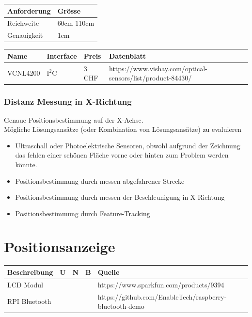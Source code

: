 \documentclass[a4paper]{report}
\begin{document}
\vspace{1em}
\noindent
\begin{tabular}{|p{}|p{}|}
  \hline
  \textbf{Anforderung} & \textbf{Grösse} \\
  \hline
  Reichweite & 60cm-110cm \\
  \hline
  Genauigkeit & 1cm \\
  \hline
\end{tabular}

\vspace{1em}
\noindent
\begin{tabular}{|p{}|p{}|p{}|p{}|}
  \hline
  \textbf{Name} & \textbf{Interface} & \textbf{Preis} & \textbf{Datenblatt} \\
  \hline
  VCNL4200 & $\text{I}^2\text{C}$ & 3 CHF & https://www.vishay.com/optical-sensors/list/product-84430/ \\
  \hline
\end{tabular}

\subsubsection{Distanz Messung in X-Richtung}
Genaue Positionsbestimmung auf der X-Achse.\\
Mögliche Lösungsansätze (oder Kombination von Lösungsansätze) zu
evaluieren
\begin{itemize}
\item Ultraschall oder Photoelektrische Sensoren, obwohl aufgrund der Zeichnung
  das fehlen einer schönen Fläche vorne oder hinten zum Problem werden könnte.
\item Positionsbestimmung durch messen abgefahrener Strecke
\item Positionsbestimmung durch messen der Beschleunigung in X-Richtung
\item Positionsbestimmung durch Feature-Tracking
\end{itemize}

\section{Positionsanzeige}
\vspace{1em}
\noindent
\begin{tabular}{|p{}|p{}|p{}|p{}|p{}|}
	\hline
	\textbf{Beschreibung} & \textbf{U} & \textbf{N} & \textbf{B} & \textbf{Quelle} \\
	\hline
	LCD Modul & & & & https://www.sparkfun.com/products/9394 \\
	\hline
	RPI Bluetooth & & & & https://github.com/EnableTech/raspberry-bluetooth-demo \\
	\hline
\end{tabular}
\end{document}
